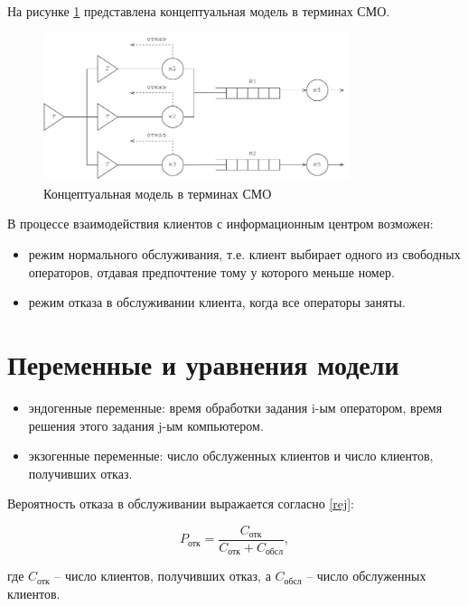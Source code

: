 \noindent На рисунке \ref{fig:smo} представлена концептуальная модель в терминах СМО.
\begin{figure}[H]
	\centering
	\includegraphics[width=0.8\textwidth]{assets/smo.pdf}
	\caption{Концептуальная модель в терминах СМО}
	\label{fig:smo}
\end{figure}

\noindent В процессе взаимодействия клиентов с информационным центром возможен:

\begin{itemize} 
	\item режим нормального обслуживания, т.е. клиент выбирает одного из свободных операторов, отдавая предпочтение тому у которого меньше номер.
	\item режим отказа в обслуживании клиента, когда все операторы заняты. 
\end{itemize}

\section{Переменные и уравнения модели}
\begin{itemize} 
	\item эндогенные переменные: время обработки задания i-ым оператором, время решения этого задания j-ым компьютером.
	\item экзогенные переменные: число обслуженных клиентов и число клиентов, получивших отказ.
\end{itemize}

Вероятность отказа в обслуживании выражается согласно \ref{rej}:

\begin{equation}\label{rej}
	P_{\text{отк}} = \frac{C_{\text{отк}}}{C_{\text{отк}} + C_{\text{обсл}}},
\end{equation}

где $C_\text{отк}$ -- число клиентов, получивших отказ, а $C_\text{обсл}$ -- число обслуженных клиентов.

